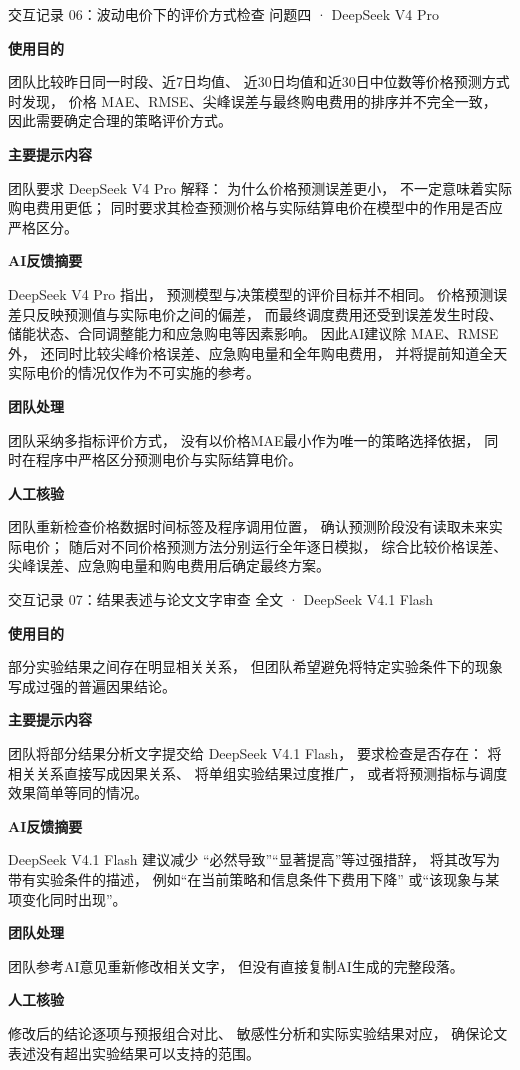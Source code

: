 \documentclass[UTF8,a4paper,11pt]{ctexart}
\newcommand{\recorditem}[1]{%
    \par\vspace{0.28em}
    \noindent\textbf{#1}\quad
}
\begin{document}
\begin{recordbox}
{交互记录 06：波动电价下的评价方式检查}
{问题四 · DeepSeek V4 Pro}

\recorditem{使用目的}
团队比较昨日同一时段、近7日均值、
近30日均值和近30日中位数等价格预测方式时发现，
价格 MAE、RMSE、尖峰误差与最终购电费用的排序并不完全一致，
因此需要确定合理的策略评价方式。

\recorditem{主要提示内容}
团队要求 DeepSeek V4 Pro 解释：
为什么价格预测误差更小，
不一定意味着实际购电费用更低；
同时要求其检查预测价格与实际结算电价在模型中的作用是否应严格区分。

\recorditem{AI反馈摘要}
DeepSeek V4 Pro 指出，
预测模型与决策模型的评价目标并不相同。
价格预测误差只反映预测值与实际电价之间的偏差，
而最终调度费用还受到误差发生时段、
储能状态、合同调整能力和应急购电等因素影响。
因此AI建议除 MAE、RMSE 外，
还同时比较尖峰价格误差、应急购电量和全年购电费用，
并将提前知道全天实际电价的情况仅作为不可实施的参考。

\recorditem{团队处理}
团队采纳多指标评价方式，
没有以价格MAE最小作为唯一的策略选择依据，
同时在程序中严格区分预测电价与实际结算电价。

\recorditem{人工核验}
团队重新检查价格数据时间标签及程序调用位置，
确认预测阶段没有读取未来实际电价；
随后对不同价格预测方法分别运行全年逐日模拟，
综合比较价格误差、尖峰误差、应急购电量和购电费用后确定最终方案。
\end{recordbox}

\begin{recordbox}
{交互记录 07：结果表述与论文文字审查}
{全文 · DeepSeek V4.1 Flash}

\recorditem{使用目的}
部分实验结果之间存在明显相关关系，
但团队希望避免将特定实验条件下的现象写成过强的普遍因果结论。

\recorditem{主要提示内容}
团队将部分结果分析文字提交给 DeepSeek V4.1 Flash，
要求检查是否存在：
将相关关系直接写成因果关系、
将单组实验结果过度推广，
或者将预测指标与调度效果简单等同的情况。

\recorditem{AI反馈摘要}
DeepSeek V4.1 Flash 建议减少
“必然导致”“显著提高”等过强措辞，
将其改写为带有实验条件的描述，
例如“在当前策略和信息条件下费用下降”
或“该现象与某项变化同时出现”。

\recorditem{团队处理}
团队参考AI意见重新修改相关文字，
但没有直接复制AI生成的完整段落。

\recorditem{人工核验}
修改后的结论逐项与预报组合对比、
敏感性分析和实际实验结果对应，
确保论文表述没有超出实验结果可以支持的范围。
\end{recordbox}
\end{document}
